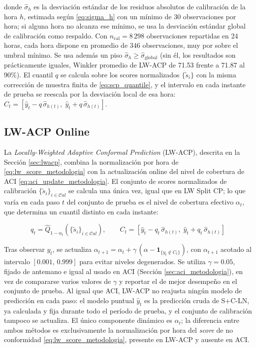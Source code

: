 donde $\hat{\sigma}_h$ es la desviación estándar de los residuos absolutos de calibración de la hora $h$, estimada según \eqref{eq:sigma_h} con un mínimo de 30 observaciones por hora; si alguna hora no alcanza ese mínimo, se usa la desviación estándar global de calibración como respaldo. Con $n_{\text{cal}} = 8\,298$ observaciones repartidas en 24 horas, cada hora dispone en promedio de $346$ observaciones, muy por sobre el umbral mínimo. Se usa además un piso $\hat{\sigma}_h \geq \hat{\sigma}_{\text{global}}$ (sin él, los resultados son prácticamente iguales, Winkler promedio de LW-ACP de 71.53 frente a 71.87 al 90\%). El cuantil $q$ se calcula sobre los scores normalizados $\{\tilde{s}_i\}$ con la misma corrección de muestra finita de \eqref{eq:scp_quantile}, y el intervalo en cada instante de prueba se reescala por la desviación local de esa hora: $C_t = [\hat{y}_t - q\,\hat{\sigma}_{h(t)},\; \hat{y}_t + q\,\hat{\sigma}_{h(t)}]$.

\subsection{LW-ACP Online}

La \textit{Locally-Weighted Adaptive Conformal Prediction} (LW-ACP), descrita en la Sección \ref{sec:lwacp}, combina la normalización por hora de \eqref{eq:lw_score_metodologia} con la actualización online del nivel de cobertura de ACI \eqref{eq:aci_update_metodologia}. El conjunto de scores normalizados de calibración $\{\tilde{s}_i\}_{i \in \mathcal{C}al}$ se calcula una única vez, igual que en LW Split CP; lo que varía en cada paso $t$ del conjunto de prueba es el nivel de cobertura efectivo $\alpha_t$, que determina un cuantil distinto en cada instante:

\begin{equation}
    q_t = \hat{Q}_{1-\alpha_t}\!\left(\{\tilde{s}_i\}_{i \in \mathcal{C}al}\right), \qquad
    C_t = \left[\hat{y}_t - q_t\,\hat{\sigma}_{h(t)},\; \hat{y}_t + q_t\,\hat{\sigma}_{h(t)}\right]
\end{equation}

Tras observar $y_t$, se actualiza $\alpha_{t+1} = \alpha_t + \gamma\,(\alpha - \mathbf{1}_{\{y_t \notin C_t\}})$, con $\alpha_{t+1}$ acotado al intervalo $[0.001,\, 0.999]$ para evitar niveles degenerados. Se utiliza $\gamma = 0.05$, fijado de antemano e igual al usado en ACI (Sección \ref{sec:aci_metodologia}), en vez de compararse varios valores de $\gamma$ y reportar el de mejor desempeño en el conjunto de prueba. Al igual que ACI, LW-ACP no reajusta ningún modelo de predicción en cada paso: el modelo puntual $\hat{y}_t$ es la predicción cruda de S+C-LN, ya calculada y fija durante todo el período de prueba, y el conjunto de calibración tampoco se actualiza. El único componente dinámico es $\alpha_t$; la diferencia entre ambos métodos es exclusivamente la normalización por hora del \textit{score} de no conformidad \eqref{eq:lw_score_metodologia}, presente en LW-ACP y ausente en ACI.


